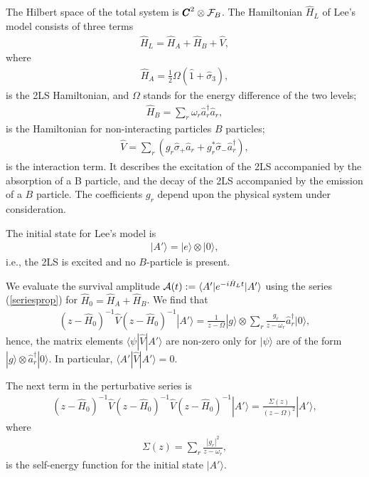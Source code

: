 \documentclass[12pt]{article}
\numberwithin{equation}{section}
\begin{document}
The Hilbert space of the total system is  ${\pmb C}^2 \otimes {\cal F}_B$. The Hamiltonian
  $\hat{H}_L$ of Lee's model consists of three terms
\begin{eqnarray}
\hat{H}_L = \hat{H}_A + \hat{H}_B + \hat{V} ,
\end{eqnarray}
where
\begin{eqnarray}
\hat{H}_A = \frac{1}{2} \Omega (\hat{1} + \hat{\sigma}_3) , \label{vlee1}
\end{eqnarray}
is the 2LS Hamiltonian, and $\Omega$ stands for the energy difference of the two levels;
\begin{eqnarray}
\hat{H}_B =  \sum_r \omega_r \hat{a}^{\dagger}_r \hat{a}_r, \label{vlee2}
\end{eqnarray}
is the   Hamiltonian for non-interacting particles $B$ particles;
\begin{eqnarray}
\hat{V} = \sum_r \left(g_r \hat{\sigma}_+   \hat{a}_r + g^*_r  \hat{\sigma}_-   \hat{a}_r^{\dagger} \right), \label{vlee3}
\end{eqnarray}
  is the interaction term. It describes the excitation of the 2LS accompanied by the absorption of a B particle, and the decay of the 2LS accompanied by the emission of a $B$ particle.
   The coefficients  $g_r$ depend upon the physical system under consideration.

The initial state for Lee's model is
\begin{eqnarray}
|A'\rangle = |e\rangle \otimes |0\rangle,
\end{eqnarray}
i.e., the 2LS is excited and no $B$-particle is present.

 We evaluate the survival amplitude
  ${\cal A}(t) := \langle A' |e^{-i\hat{H}_L t}|A'\rangle$ using the series (\ref{seriesprop}) for $\hat{H}_0 = \hat{H}_A + \hat{H}_B$.  We find that
\begin{eqnarray}
(z-\hat{H}_0)^{-1}\hat{V}(z-\hat{H}_0)^{-1}|A'\rangle =  \frac{1}{z - \Omega} |g\rangle \otimes \sum_r \frac{g_r}{z- \omega_r} \hat{a}^{\dagger}_r|0\rangle,
\end{eqnarray}
hence,  the  matrix elements
 $\langle \psi|\hat{V}|A'\rangle$ are non-zero only for $|\psi\rangle$
are of the form $|g\rangle \otimes \hat{a}^{\dagger}_r|0\rangle$.  In particular, $\langle A'|\hat{V}|A'\rangle = 0$.

The next term in the perturbative series is
\begin{eqnarray}
(z-\hat{H}_0)^{-1}\hat{V} (z - \hat{H}_0)^{-1} \hat{V}(z - \hat{H}_0)^{-1}|A'\rangle = \frac{\Sigma(z)}{(z- \Omega)^2}  |A'\rangle, \label{leetwo}
\end{eqnarray}
where
\begin{eqnarray}
\Sigma(z) = \sum_r \frac{|g_r|^2}{z-\omega_r}, \label{selee}
\end{eqnarray}
is the self-energy function for the initial state  $|A'\rangle$.
\end{document}
